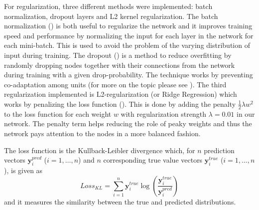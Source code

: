 \documentclass[11pt, a4paper]{article}
\begin{document}
For regularization, three different methods were implemented: batch normalization, dropout layers and L2 kernel regularization. The batch normalization (\cite{ioffe2015batch}) is both useful to regularize the network and it improves training speed and performance by normalizing the input for each layer in the network for each mini-batch. This is used to avoid the problem of the varying distribution of input during training. The dropout (\cite{srivastava2014dropout}) is a method to reduce overfitting by randomly dropping nodes together with their connections from the network during training with a given drop-probability. The technique works by preventing co-adaptation among units (for more on the topic please see \cite{hinton2012improving}). The third regularization implemented is L2-regularization (or Ridge Regression) which works by penalizing the loss function (\cite{ng2004feature}). This is done by adding the penalty $\frac{1}{2}\lambda w^2$ to the loss function for each weight $w$ with regularization strength $\lambda = 0.01$ in our network. The penalty term helps reducing the role of peaky weights and thus the network pays attention to the nodes in a more balanced fashion.

The loss function is the Kullback-Leibler divergence which, for $n$ prediction vectors $\mathbf{y}^{pred}_i$ ($i= 1, \dots, n$) and $n$ corresponding true value vectors $\mathbf{y}^{true}_i$ ($i= 1, \dots, n$), is given as
\begin{equation}
    \label{eq:KL}
    Loss_{KL} = \sum_{i=1}^{n}\mathbf{y}_i^{true} \log \left( \frac{\mathbf{y}_i^{true}}{\mathbf{y}_i^{pred}}\right)
\end{equation}
and it measures the similarity between the true and predicted distributions.
\end{document}
